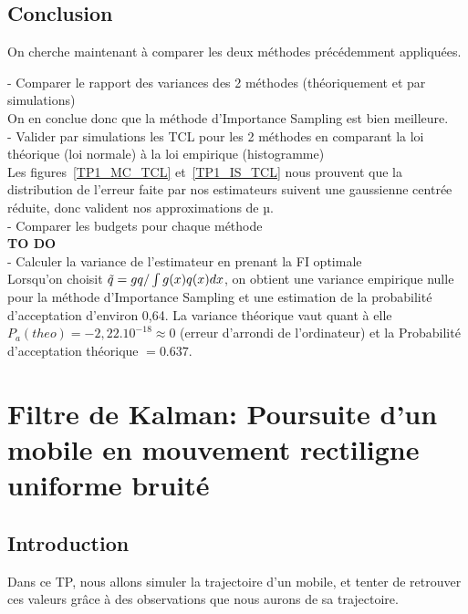 \documentclass{article}
\begin{document}
\subsection{Conclusion}
On cherche maintenant à comparer les deux méthodes précédemment appliquées.

- Comparer le rapport des variances des 2 méthodes (théoriquement et par simulations)\\
On en conclue donc que la méthode d'Importance Sampling est bien meilleure.\\

- Valider par simulations les TCL pour les 2 méthodes en comparant la loi théorique (loi normale) à la loi empirique (histogramme)\\
Les figures~\ref{TP1_MC_TCL} et~\ref{TP1_IS_TCL} nous prouvent que la distribution de l'erreur faite par nos estimateurs suivent une gaussienne centrée réduite, donc valident nos approximations de µ.\\

- Comparer les budgets pour chaque méthode\\
\textbf{TO DO}\\

- Calculer la variance de l’estimateur en prenant la FI optimale\\
Lorsqu'on choisit $\Tilde{q}=gq/ \int g(x)q(x)dx$, on obtient une variance empirique nulle pour la méthode d'Importance Sampling et une estimation de la probabilité d'acceptation d'environ 0,64. La variance théorique vaut quant à elle $P_a(theo)=-2,22.10^{-18}\approx 0$ (erreur d'arrondi de l'ordinateur) et la Probabilité d'acceptation théorique $=0.637$.\\










\newpage
\section{Filtre de Kalman: Poursuite d'un mobile en mouvement rectiligne uniforme bruité}
\subsection{Introduction}
Dans ce TP, nous allons simuler la trajectoire d'un mobile, et tenter de retrouver ces valeurs grâce à des observations que nous aurons de sa trajectoire.
\end{document}
